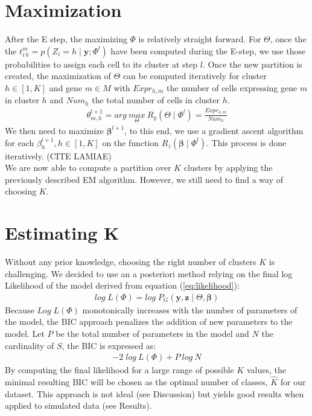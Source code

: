 \section{Maximization}
After the E step, the maximizing $\Phi$ is relatively straight forward. For $\Theta$, once the the $t_{i\,h}^{m} = p(Z_i = h \mid \mathbf{y};\Phi^{l})$ have been computed during the E-step, we use those probabilities to assign each cell to its cluster at step $l$. Once the new partition is created, the maximization of $\Theta$ can be computed iteratively for cluster $h \in [1,K]$ and gene $m \in M$ with $Expr_{h,m}$ the number of cells expressing gene $m$ in cluster $h$ and $Num_h$ the total number of cells in cluster $h$.
\begin{align*}
\theta_{m,h}^{l+1} = arg\:\underset{\Theta}{max}\:R_y(\Theta\mid \Phi^l) = \frac{Expr_{h,m}}{Num_h}
\end{align*}
We then need to maximize $\mathbf{\beta}^{l+1}$, to this end, we use a gradient ascent algorithm  for each $\beta_h^{l+1}, h \in [1,K]$ on the function $R_z(\mathbf{\beta}\mid \Phi^l)$. This process is done iteratively. (CITE LAMIAE)\\

We are now able to compute a partition over $K$ clusters by applying the previously described EM algorithm. However, we still need to find a way of choosing $K$.

\section{Estimating K}
Without any prior knowledge, choosing the right number of clusters $K$ is challenging. We decided to use an a posteriori method relying on the final log Likelihood of the model derived from equation (\ref{eq:likelihood}):
\begin{align*}
log\;L(\Phi) = 	log\;P_G(\mathbf{y},\mathbf{z} \mid \Theta, \mathbf{\beta})
\end{align*}
Because $Log\;L(\Phi)$ monotonically increases with the number of parameters of the model, the BIC approach penalizes the addition of new parameters to the model. Let $P$ be the total number of parameters in the model and $N$ the cardinality of $S$, the BIC is expressed as:
\begin{align*}
\label{eq:BIC}
- 2\; log\:L(\Phi) + P\:log\:N
\end{align*}
By computing the final likelihood for a large range of possible $K$ values, the minimal resulting BIC will be chosen as the optimal number of classes, $\hat{K}$ for our dataset. This approach is not ideal (see Discussion) but yields good results when applied to simulated data (see Results).

